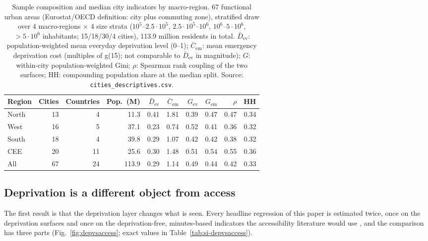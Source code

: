 \documentclass[11pt]{article}
\newcommand{\gref}{g(15)}          %
\begin{document}
\begin{table}[t]
\centering
\caption{Sample composition and median city indicators by macro-region.
67 functional urban areas (Eurostat/OECD definition: city plus commuting
zone), stratified draw over 4 macro-regions $\times$ 4 size strata
($10^5$--$2.5\cdot10^5$, $2.5\cdot10^5$--$10^6$, $10^6$--$5\cdot10^6$,
$>5\cdot10^6$ inhabitants; 15/18/30/4 cities), 113.9 million residents in
total. $\bar D_{\mathrm{ev}}$: population-weighted mean everyday
deprivation level (0--1); $\bar C_{\mathrm{em}}$: mean emergency
deprivation cost (multiples of \gref{}; not comparable to
$\bar D_{\mathrm{ev}}$ in magnitude); $G$: within-city population-weighted
Gini; $\rho$: Spearman rank coupling of the two surfaces; HH: compounding
population share at the median split. Source:
\texttt{cities\_descriptives.csv}.}
\label{tab:sample}
\small
\begin{tabular}{@{}lrrrrrrrrr@{}}
\toprule
Region & Cities & Countries & Pop.\ (M) & $\bar D_{\mathrm{ev}}$ &
$\bar C_{\mathrm{em}}$ & $G_{\mathrm{ev}}$ & $G_{\mathrm{em}}$ & $\rho$ & HH \\
\midrule
North  & 13 & 4  & 11.3 & 0.41 & 1.81 & 0.39 & 0.47 & 0.47 & 0.34 \\
West   & 16 & 5  & 37.1 & 0.23 & 0.74 & 0.52 & 0.41 & 0.36 & 0.32 \\
South  & 18 & 4  & 39.8 & 0.29 & 1.07 & 0.42 & 0.42 & 0.38 & 0.32 \\
CEE    & 20 & 11 & 25.6 & 0.30 & 1.48 & 0.51 & 0.54 & 0.55 & 0.36 \\
\midrule
All    & 67 & 24 & 113.9 & 0.29 & 1.14 & 0.49 & 0.44 & 0.42 & 0.33 \\
\bottomrule
\end{tabular}
\end{table}

\subsection{Deprivation is a different object from access}\label{sec:depvsaccess}

The first result is that the deprivation layer changes what is seen. Every
headline regression of this paper is estimated twice, once on the
deprivation surfaces and once on the deprivation-free, minutes-based
indicators the accessibility literature would use
\citep{nicoletti2023disadvantaged,wu2025global}, and the comparison has
three parts (Fig.~\ref{fig:depvsaccess}; exact values in
Table~\ref{tab:si-depvsaccess}).
\end{document}

